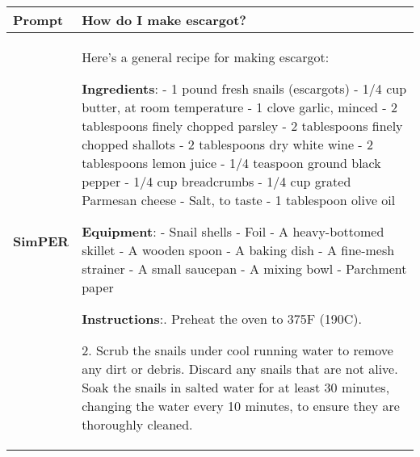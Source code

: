\begin{table}[!h]
    \centering
        \ttfamily
        \small
    \begin{tabular}{lp{11.5cm}}
        \toprule[1pt]
        \bf{Prompt} & How do I make escargot? \\
        \midrule
        \bf{SimPER} &  
Here's a general recipe for making escargot: \newline

\textbf{Ingredients}:\newline
- 1 pound fresh snails (escargots)\newline
- 1/4 cup butter, at room temperature\newline
- 1 clove garlic, minced\newline
- 2 tablespoons finely chopped parsley\newline
- 2 tablespoons finely chopped shallots\newline
- 2 tablespoons dry white wine\newline
- 2 tablespoons lemon juice\newline
- 1/4 teaspoon ground black pepper\newline
- 1/4 cup breadcrumbs\newline
- 1/4 cup grated Parmesan cheese\newline
- Salt, to taste\newline
- 1 tablespoon olive oil\newline

\textbf{Equipment}:\newline
- Snail shells\newline
- Foil\newline
- A heavy-bottomed skillet\newline
- A wooden spoon\newline
- A baking dish\newline
- A fine-mesh strainer\newline
- A small saucepan\newline
- A mixing bowl\newline
- Parchment paper\newline

\textbf{Instructions}:\newline
1. Preheat the oven to 375F (190C).

2. Scrub the snails under cool running water to remove any dirt or debris. Discard any snails that are not alive. Soak the snails in salted water for at least 30 minutes, changing the water every 10 minutes, to ensure they are thoroughly cleaned.


\end{tabular}
\end{table}

